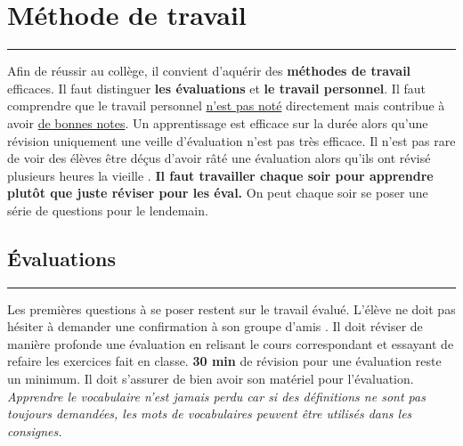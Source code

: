 \documentclass[11pt]{article}
\newcommand{\horrule}[1]{\rule{\linewidth}{#1}} %
\begin{document}
\setlength{\columnseprule}{1pt}

\section*{Méthode de travail}
\horrule{2px}

Afin de réussir au collège, il convient d'aquérir des \textbf{méthodes de travail} efficaces. Il faut distinguer \textbf{les évaluations} et \textbf{le travail personnel}. Il faut comprendre que le travail personnel \underline{n'est pas noté} directement mais contribue à avoir \underline{de bonnes notes}. Un apprentissage est efficace sur la durée alors qu'une révision uniquement une veille d'évaluation n'est pas très efficace. Il n'est pas rare de voir des élèves être déçus d'avoir râté une évaluation alors qu'ils ont révisé \og plusieurs heures la vieille \fg. \textbf{Il faut travailler chaque soir pour apprendre plutôt que juste réviser pour les éval.} On peut chaque soir se poser une série de questions pour le lendemain. 

\subsection*{Évaluations}
\horrule{1px}

Les premières questions à se poser restent sur le travail évalué. L'élève ne doit pas hésiter à demander une confirmation à son groupe \og d'amis \fg.  Il doit réviser de manière profonde une évaluation en relisant le cours correspondant et essayant de refaire les exercices fait en classe. \textbf{30 min} de révision pour une évaluation reste un minimum. Il doit s'assurer de bien avoir son matériel pour l'évaluation.  \textit{Apprendre le vocabulaire n'est jamais perdu car si des définitions ne sont pas toujours demandées, les mots de vocabulaires peuvent être utilisés dans les consignes. }
\end{document}
